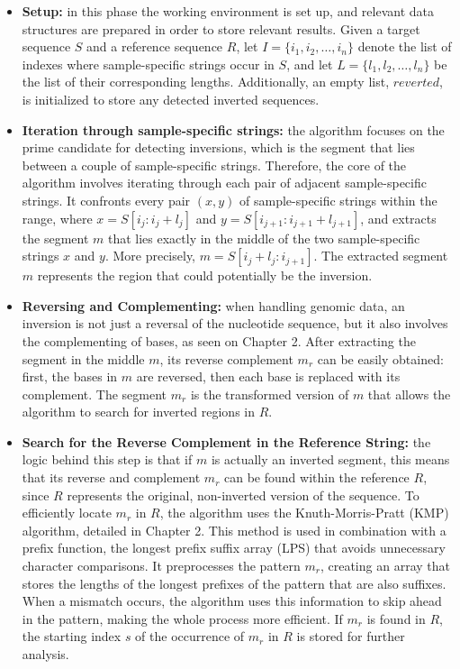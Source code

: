 \begin{itemize}
    \item \textbf{Setup: } in this phase the working environment is set up, and relevant data structures are prepared in order to store relevant results. Given a target sequence \( S \) and a reference sequence \( R \), let \( I = \{ i_1, i_2, \dots , i_n \} \) denote the list of indexes where sample-specific strings occur in \( S \), and let \( L = \{ l_1, l_2, \dots , l_n \} \) be the list of their corresponding lengths. Additionally, an empty list, \( reverted \), is initialized to store any detected inverted sequences.
    \item \textbf{Iteration through sample-specific strings: } the algorithm focuses on the prime candidate for detecting inversions, which is the segment that lies between a couple of sample-specific strings. Therefore, the core of the algorithm involves iterating through each  pair of adjacent sample-specific strings.  It confronts every pair \( (x, y) \) of sample-specific strings within the range, where \( x = S[i_j : i_j + l_j] \) and \( y = S[i_{j+1} : i_{j+1} + l_{j+1}] \), and extracts the segment \( m \) that lies exactly in the middle of the two sample-specific strings \( x \) and \( y \). More precisely, \( m = S[i_j + l_j : i_{j+1}] \). The extracted segment \( m \) represents the region that could potentially be the inversion.
    \item \textbf{Reversing and Complementing: } when handling genomic data, an inversion is not just a reversal of the nucleotide sequence, but it also involves the complementing of bases, as seen on Chapter 2. After extracting the segment in the middle \( m \), its reverse complement \( m_r \) can be easily obtained: first, the bases in \( m \) are reversed, then each base is replaced with its complement. The segment \( m_r \) is the transformed version of \( m \) that allows the algorithm to search for inverted regions in \( R \). 
    \item \textbf{Search for the Reverse Complement in the Reference String: } the logic behind this step is that if \( m \) is actually an inverted segment, this means that its reverse and complement \( m_r \) can be found within the reference \( R \), since \( R \) represents the original, non-inverted version of the sequence. To efficiently locate \( m_r \) in \( R \), the algorithm uses the Knuth-Morris-Pratt (KMP) algorithm, detailed in Chapter 2. This method is used in combination with a prefix function, the longest prefix suffix array (LPS) that avoids unnecessary character comparisons. It preprocesses the pattern \( m_r \), creating an array that stores the lengths of the longest prefixes of the pattern that are also suffixes. When a mismatch occurs, the algorithm uses this information to skip ahead in the pattern, making the whole process more efficient. If \( m_r \) is found in \( R \), the starting index \( s \) of the occurrence of \( m_r \) in \( R \) is stored for further analysis. 

\end{itemize}
